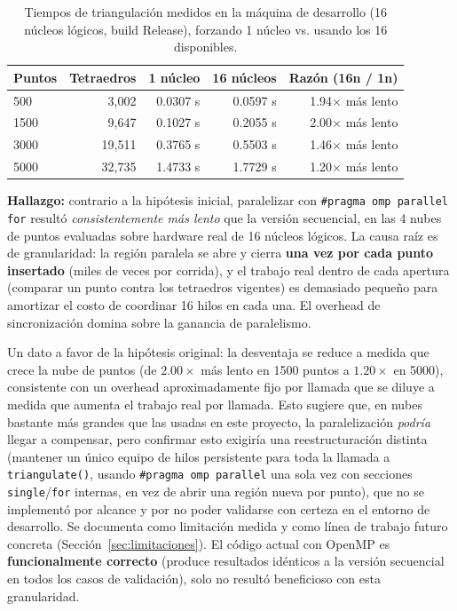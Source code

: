 \documentclass[12pt,a4paper]{article}
\begin{document}
\begin{table}[H]
\centering
\caption{Tiempos de triangulación medidos en la máquina de desarrollo (16 núcleos lógicos, build Release), forzando 1 núcleo vs. usando los 16 disponibles.}
\begin{tabular}{@{}lrrrr@{}}
\toprule
\textbf{Puntos} & \textbf{Tetraedros} & \textbf{1 núcleo} & \textbf{16 núcleos} & \textbf{Razón (16n / 1n)} \\
\midrule
500  & 3,002  & 0.0307 s & 0.0597 s & 1.94$\times$ más lento \\
1500 & 9,647  & 0.1027 s & 0.2055 s & 2.00$\times$ más lento \\
3000 & 19,511 & 0.3765 s & 0.5503 s & 1.46$\times$ más lento \\
5000 & 32,735 & 1.4733 s & 1.7729 s & 1.20$\times$ más lento \\
\bottomrule
\end{tabular}
\end{table}

\textbf{Hallazgo:} contrario a la hipótesis inicial, paralelizar con
\texttt{\#pragma omp parallel for} resultó \emph{consistentemente más
lento} que la versión secuencial, en las 4 nubes de puntos evaluadas
sobre hardware real de 16 núcleos lógicos. La causa raíz es de
granularidad: la región paralela se abre y cierra \textbf{una vez por
cada punto insertado} (miles de veces por corrida), y el trabajo real
dentro de cada apertura (comparar un punto contra los tetraedros
vigentes) es demasiado pequeño para amortizar el costo de coordinar 16
hilos en cada una. El overhead de sincronización domina sobre la
ganancia de paralelismo.

Un dato a favor de la hipótesis original: la desventaja se reduce a
medida que crece la nube de puntos (de $2.00\times$ más lento en 1500
puntos a $1.20\times$ en 5000), consistente con un overhead
aproximadamente fijo por llamada que se diluye a medida que aumenta el
trabajo real por llamada. Esto sugiere que, en nubes bastante más
grandes que las usadas en este proyecto, la paralelización \emph{podría}
llegar a compensar, pero confirmar esto exigiría una reestructuración
distinta (mantener un único equipo de hilos persistente para toda la
llamada a \texttt{triangulate()}, usando \texttt{\#pragma omp parallel}
una sola vez con secciones \texttt{single}/\texttt{for} internas, en
vez de abrir una región nueva por punto), que no se implementó por
alcance y por no poder validarse con certeza en el entorno de
desarrollo. Se documenta como limitación medida y como línea de trabajo
futuro concreta (Sección~\ref{sec:limitaciones}). El código actual con
OpenMP es \textbf{funcionalmente correcto} (produce resultados
idénticos a la versión secuencial en todos los casos de validación),
solo no resultó beneficioso con esta granularidad.
\end{document}
